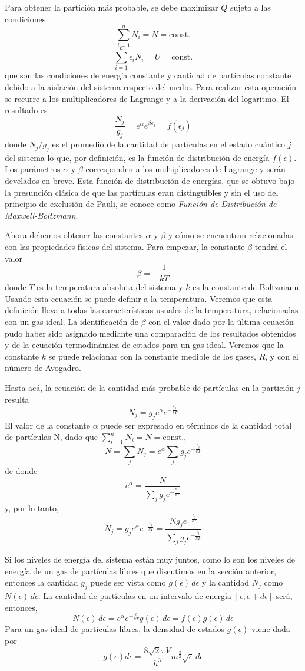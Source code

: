 \documentclass[12pt,a4paper]{article}
\def\e{{\epsilon}} %
\begin{document}
Para obtener la partición más probable, se debe maximizar $Q$ sujeto a las condiciones
\[ \sum _{i=1}^{n} N_{i}=N=\textrm{const.} \]
\[ \sum _{i=1}^{n} \e _{i}N_{i}=U=\textrm{const.} \]
que son las condiciones de energía constante y cantidad de partículas constante debido a la aislación del sistema respecto del medio. Para realizar esta operación se recurre a los multiplicadores de Lagrange y a la derivación del logaritmo. El resultado es
\[ \frac{N_{j}}{g_{j}}=e^{\alpha}e^{\beta \e_{j}}=f(\e_{j}) \]
donde $N_{j}/g_{j}$ es el promedio de la cantidad de partículas en el estado cuántico $j$ del sistema lo que, por definición, es la función de distribución de energía $f(\e)$. Los parámetros $\alpha$ y $\beta$ corresponden a los multiplicadores de Lagrange y serán develados en breve. Esta función de distribución de energías, que se obtuvo bajo la presunción clásica de que las partículas eran distinguibles y sin el uso del principio de exclusión de Pauli, se conoce como \emph{Función de Distribución de Maxwell-Boltzmann}.

Ahora debemos obtener las constantes $\alpha$ y $\beta$ y cómo se encuentran relacionadas con las propiedades físicas del sistema. Para empezar, la constante $\beta$ tendrá el valor
\[ \beta=-\frac{1}{kT} \]
donde $T$ es la temperatura absoluta del sistema y $k$ es la constante de Boltzmann. Usando esta ecuación se puede definir a la temperatura. Veremos que esta definición lleva a todas las características usuales de la temperatura, relacionadas con un gas ideal. La identificación de $\beta$ con el valor dado por la última ecuación pudo haber sido asignado mediante una comparación de los resultados obtenidos y de la ecuación termodinámica de estados para un gas ideal. Veremos que la constante $k$ se puede relacionar con la constante medible de los gases, $R$, y con el número de Avogadro.

Hasta acá, la ecuación de la cantidad más probable de partículas en la partición $j$ resulta
\[ N_{j}=g_{j} e^{\alpha}e^{-\frac{\e_{j}}{kT}}\]
El valor de la constante $\alpha$ puede ser expresado en términos de la cantidad total de partículas N, dado que $\sum _{i=1}^{n} N_{i}=N=\textrm{const.}$,
\[ N=\sum _{j}N_{j}=e^{\alpha}\sum _{j} g_{j} e^{-\frac{\e_{j}}{kT}} \]
de donde
\[ e^{\alpha}=\frac{N}{\sum _{j} g_{j}e^{-\frac{\e_{j}}{kT}}} \]
y, por lo tanto,
\[ N_{j}=g_{j}e^{\alpha}e^{-\frac{\e_{j}}{kT}}=\frac{Ng_{j}e^{-\frac{\e_{j}}{kT}}}{\sum _{j} g_{j}e^{-\frac{\e_{j}}{kT}}} \]

Si los niveles de energía del sistema están muy juntos, como lo son los niveles de energía de un gas de partículas libres que discutimos en la sección anterior, entonces la cantidad $g_{j}$ puede ser vista como $g(\e) \, d\e$ y la cantidad $N_{j}$ como $N(\e) \, d\e$. La cantidad de partículas en un intervalo de energía $[\e;\e+d\e]$ será, entonces,
\[ N(\e) \, d\e=e^{\alpha} e^{-\frac{\e}{kT}} g(\e) \, d\e = f(\e)g(\e) \, d\e \]
Para un gas ideal de partículas libres, la densidad de estados $g(\e)$ viene dada por
\[ g(\e)d\e=\frac{8\sqrt{2} \pi V}{h^{3}}m^{\frac{3}{2}} \sqrt{\e} \, d\e \]
\end{document}
